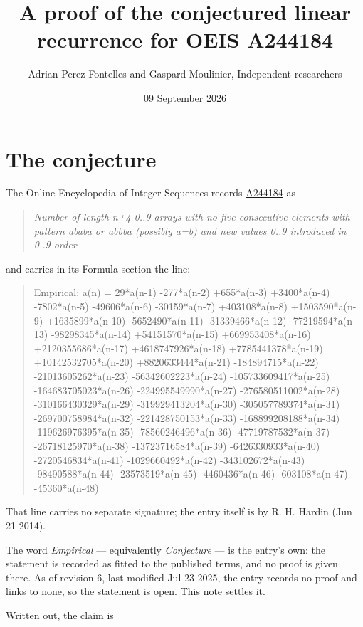 \documentclass[11pt]{article}
\title{A proof of the conjectured linear recurrence for OEIS A244184}
\author{Adrian Perez Fontelles and Gaspard Moulinier, Independent researchers}
\date{09 September 2026}
\theoremstyle{definition}
\begin{document}
\maketitle
\section{The conjecture}

The Online Encyclopedia of Integer Sequences records \href{https://oeis.org/A244184}{A244184} as

\begin{quote}\itshape Number of length n+4 0..9 arrays with no five consecutive elements with pattern ababa or abbba (possibly a=b) and new values 0..9 introduced in 0..9 order\end{quote}

and carries in its Formula section the line:

\begin{quote}\ttfamily Empirical: a(n) = 29*a(n-1) -277*a(n-2) +655*a(n-3) +3400*a(n-4) -7802*a(n-5) -49606*a(n-6) -30159*a(n-7) +403108*a(n-8) +1503590*a(n-9) +1635899*a(n-10) -5652490*a(n-11) -31339466*a(n-12) -77219594*a(n-13) -98298345*a(n-14) +54151570*a(n-15) +669953408*a(n-16) +2120355686*a(n-17) +4618747926*a(n-18) +7785441378*a(n-19) +10142532705*a(n-20) +8820633444*a(n-21) -184894715*a(n-22) -21013605262*a(n-23) -56342602223*a(n-24) -105733609417*a(n-25) -164683705023*a(n-26) -224995549990*a(n-27) -276580511002*a(n-28) -310166430329*a(n-29) -319929413204*a(n-30) -305057789374*a(n-31) -269700758984*a(n-32) -221428750153*a(n-33) -168899208188*a(n-34) -119626976395*a(n-35) -78560246496*a(n-36) -47719787532*a(n-37) -26718125970*a(n-38) -13723716584*a(n-39) -6426330933*a(n-40) -2720546834*a(n-41) -1029660492*a(n-42) -343102672*a(n-43) -98490588*a(n-44) -23573519*a(n-45) -4460436*a(n-46) -603108*a(n-47) -45360*a(n-48)\end{quote}

That line carries no separate signature; the entry itself is by R. H. Hardin (Jun 21 2014).

The word {\itshape Empirical} --- equivalently {\itshape Conjecture} --- is the entry's own: the statement is recorded as fitted to the published terms, and no proof is given there. As of revision 6, last modified Jul 23 2025, the entry records no proof and links to none, so the statement is open. This note settles it.

Written out, the claim is
\end{document}
